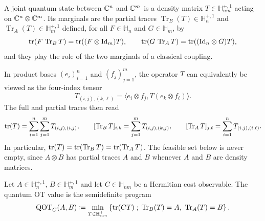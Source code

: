 \begin{defn}\label{def-joint-quantum-state}
A joint quantum state between $\mathbb{C}^n$ and $\mathbb{C}^m$ is a density matrix $T\in\mathbb H_{nm}^{+,1}$ acting on $\mathbb{C}^n\otimes\mathbb{C}^m$. Its marginals are the partial traces $\operatorname{Tr}_B(T)\in\mathbb H_n^{+,1}$ and $\operatorname{Tr}_A(T)\in\mathbb H_m^{+,1}$ defined, for all $F\in\mathbb H_n$ and $G\in\mathbb H_m$, by
\begin{equation}\label{eq-qot-partial-traces}
	\operatorname{tr}(F\,\operatorname{Tr}_B T)=\operatorname{tr}((F\otimes\mathrm{Id}_m)T),
	\qquad
	\operatorname{tr}(G\,\operatorname{Tr}_A T)=\operatorname{tr}((\mathrm{Id}_n\otimes G)T),
\end{equation}
and they play the role of the two marginals of a classical coupling.
\end{defn}

In product bases $(e_i)_{i=1}^n$ and $(f_j)_{j=1}^m$, the operator $T$ can equivalently be viewed as the four-index tensor
\[
	T_{(i,j),(k,\ell)}
	=
	\langle e_i\otimes f_j,T(e_k\otimes f_\ell)\rangle.
\]
The full and partial traces then read
\begin{equation}\label{eq-qot-partial-traces-indices}
	\operatorname{tr}(T)=\sum_{i=1}^n\sum_{j=1}^m T_{(i,j),(i,j)},
	\qquad
	[\operatorname{Tr}_B T]_{i,k}=\sum_{j=1}^m T_{(i,j),(k,j)},
	\qquad
	[\operatorname{Tr}_A T]_{j,\ell}=\sum_{i=1}^n T_{(i,j),(i,\ell)}.
\end{equation}
In particular, $\operatorname{tr}(T)=\operatorname{tr}(\operatorname{Tr}_B T)=\operatorname{tr}(\operatorname{Tr}_A T)$. The feasible set below is never empty, since $A\otimes B$ has partial traces $A$ and $B$ whenever $A$ and $B$ are density matrices.

\begin{defn}\label{def-finite-dimensional-qot}
	Let $A\in\mathbb H_n^{+,1}$, $B\in\mathbb H_m^{+,1}$ and let $C\in\mathbb H_{nm}$ be a Hermitian cost observable. The quantum OT value is the semidefinite program
	\begin{equation}\label{eq-qot-primal}
		\mathrm{QOT}_C(A,B)
		\eqdef
		\min_{T\in\mathbb H_{nm}^+}
		\enscond{\tr(CT)}{\operatorname{Tr}_B(T)=A,\ \operatorname{Tr}_A(T)=B}.
	\end{equation}
\end{defn}

